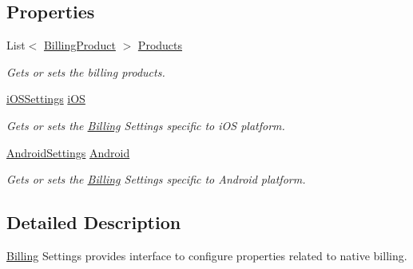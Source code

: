 \subsection*{Properties}
\begin{DoxyCompactItemize}
\item 
List$<$ \hyperlink{class_voxel_busters_1_1_native_plugins_1_1_billing_product}{Billing\+Product} $>$ \hyperlink{class_voxel_busters_1_1_native_plugins_1_1_billing_settings_ac3ca62c39e6f658ca360887a90293209}{Products}
\begin{DoxyCompactList}\small\item\em Gets or sets the billing products. \end{DoxyCompactList}\item 
\hyperlink{class_voxel_busters_1_1_native_plugins_1_1_billing_settings_1_1i_o_s_settings}{i\+O\+S\+Settings} \hyperlink{class_voxel_busters_1_1_native_plugins_1_1_billing_settings_a3bf35f819c6fe2c2806c637c02127ff8}{i\+O\+S}
\begin{DoxyCompactList}\small\item\em Gets or sets the \hyperlink{class_voxel_busters_1_1_native_plugins_1_1_billing}{Billing} Settings specific to i\+O\+S platform. \end{DoxyCompactList}\item 
\hyperlink{class_voxel_busters_1_1_native_plugins_1_1_billing_settings_1_1_android_settings}{Android\+Settings} \hyperlink{class_voxel_busters_1_1_native_plugins_1_1_billing_settings_a1c2d6ed884eda0a6f3e7bb4913332b0a}{Android}
\begin{DoxyCompactList}\small\item\em Gets or sets the \hyperlink{class_voxel_busters_1_1_native_plugins_1_1_billing}{Billing} Settings specific to Android platform. \end{DoxyCompactList}\end{DoxyCompactItemize}


\subsection{Detailed Description}
\hyperlink{class_voxel_busters_1_1_native_plugins_1_1_billing}{Billing} Settings provides interface to configure properties related to native billing. 



